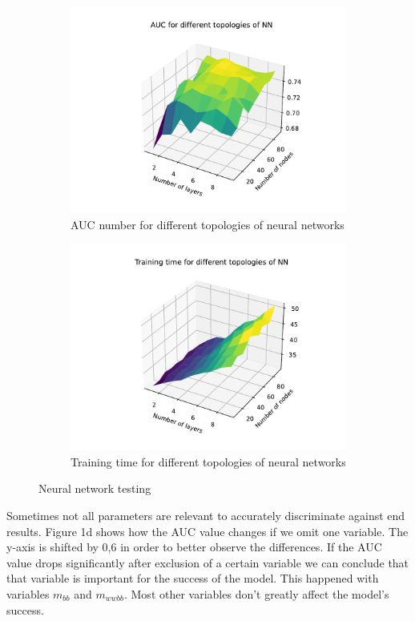 \documentclass[12pt, a4paper]{article}
\begin{document}
\begin{figure}[H]
\begin{subfigure}{0.5\textwidth}
  \includegraphics[width=\linewidth]{../graphs/layers_nodes_auc.pdf}
  \caption{AUC number for different topologies of neural networks} \label{fig:c}
  \end{subfigure}
  \hspace*{\fill}
  \begin{subfigure}{0.5\textwidth}
  \includegraphics[width=\linewidth]{../graphs/layers_nodes_time.pdf}
  \caption{Training time for different topologies of neural networks} \label{fig:d}
  \end{subfigure} 
  \caption{Neural network testing} \label{fig:1}
\end{figure}

Sometimes not all parameters are relevant to accurately discriminate against end results. Figure 1d shows how the AUC value changes if we omit one variable. The y-axis is shifted by 0,6 in order to better observe the differences. If the AUC value drops significantly after exclusion of a certain variable we can conclude that that variable is important for the success of the model. This happened with variables $m_{bb}$ and $m_{wwbb}$. Most other variables don't greatly affect the model's success.
\end{document}
